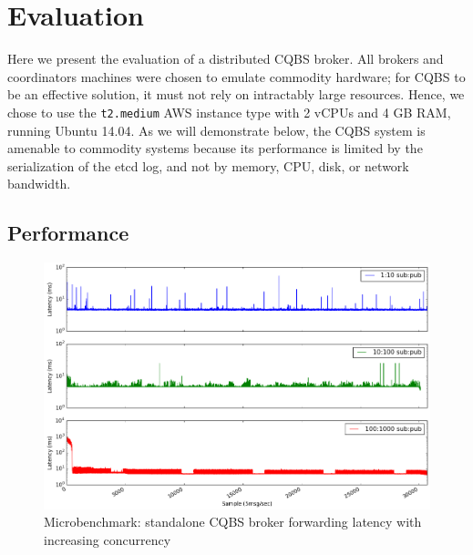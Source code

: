 \section{Evaluation} \label{section:evaluation}

Here we present the evaluation of a distributed CQBS broker.
All brokers and coordinators machines were chosen to emulate commodity hardware; for CQBS to be an effective solution, it must not rely on intractably large resources.
Hence, we chose to use the \texttt{t2.medium} AWS instance type with 2 vCPUs and 4 GB RAM, running Ubuntu 14.04.
As we will demonstrate below, the CQBS system is amenable to commodity systems because its performance is limited by the serialization of the etcd log, and not by memory, CPU, disk, or network bandwidth.

\subsection{Performance}

\begin{figure}[t]
\centering
\includegraphics[width=\linewidth]{figs/singlenodelatency.png}
\caption{Microbenchmark: standalone CQBS broker forwarding latency with increasing concurrency}
\label{fig:singlenodelatency}
\end{figure}

